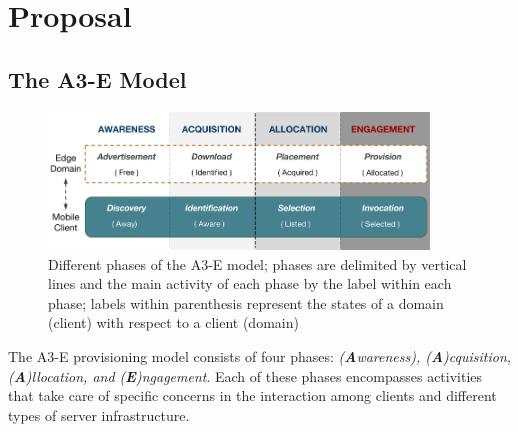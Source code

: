 \section{Proposal}\label{sec:proposal}



\subsection{The A3-E Model}

\begin{figure}
	\includegraphics[width=0.9\textwidth]{figs/A3-E.png}
	\caption{Different phases of the A3-E model; phases are delimited by vertical lines and the main activity of each phase by the label within each phase; labels within parenthesis represent the states of a domain (client) with respect to a client (domain)}
	\label{fig:A3-E-phases}
\end{figure}




The A3-E provisioning model consists of four phases: \textit{(\textbf{A}wareness), (\textbf{A})cquisition, (\textbf{A})llocation, and (\textbf{E})ngagement}. Each of these phases encompasses activities that take care of specific concerns in the interaction among clients and different types of server infrastructure. 

